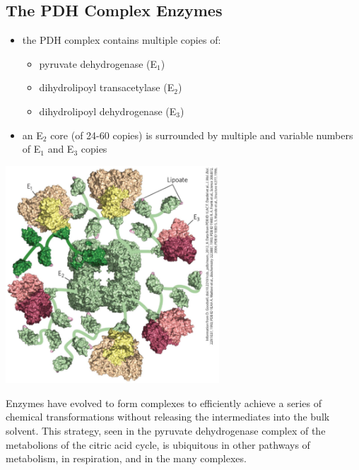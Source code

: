 \documentclass[10pt]{article}
\begin{document}
\subsection*{The PDH Complex Enzymes}
\begin{itemize}
	\item the PDH complex contains multiple copies of:
	\begin{itemize}
        \item pyruvate dehydrogenase (E$_1$)
        \item dihydrolipoyl transacetylase (E$_2$)
        \item dihydrolipoyl dehydrogenase (E$_3$)
    \end{itemize}
	\item an E$_2$ core (of 24-60 copies) is surrounded by multiple and variable numbers of E$_1$ and E$_3$ copies
\end{itemize}
\begin{center} 
	\includegraphics*[width=0.6\textwidth]{L3_16.png}
\end{center}
Enzymes have evolved to form complexes to efficiently achieve a series of chemical transformations without releasing the intermediates into the bulk solvent.  This strategy, seen in the pyruvate dehydrogenase complex of the metabolions of the citric acid cycle, is ubiquitous in other pathways of metabolism, in respiration, and in the many complexes.
\end{document}
